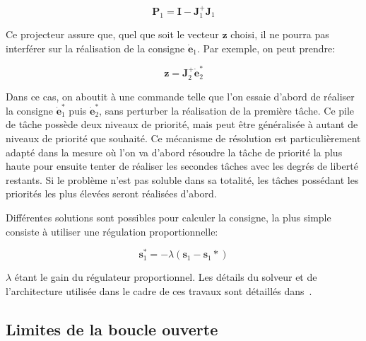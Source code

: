 \begin{equation}
  \mathbf{P}_1 = \mathbf{I} - \mathbf{J}_1^{+} \mathbf{J}_1
\end{equation}

Ce projecteur assure que, quel que soit le vecteur $\mathbf{z}$
choisi, il ne pourra pas interférer sur la réalisation de la consigne
$\dot{\mathbf{e}}_1$. Par exemple, on peut prendre:

\begin{equation}
  \mathbf{z} = \mathbf{J}_2^{+} \dot{\mathbf{e}}_2^{*}
\end{equation}

Dans ce cas, on aboutit à une commande telle que l'on essaie d'abord
de réaliser la consigne $\dot{\mathbf{e}}_1^{*}$ puis
$\dot{\mathbf{e}}_2^{*}$, sans perturber la réalisation de la première
tâche. Ce pile de tâche possède deux niveaux de priorité, mais peut
être généralisée à autant de niveaux de priorité que souhaité. Ce
mécanisme de résolution est particulièrement adapté dans la mesure où
l'on va d'abord résoudre la tâche de priorité la plus haute pour
ensuite tenter de réaliser les secondes tâches avec les degrés de
liberté restants. Si le problème n'est pas soluble dans sa totalité,
les tâches possédant les priorités les plus élevées seront réalisées
d'abord.


Différentes solutions sont possibles pour calculer la consigne, la
plus simple consiste à utiliser une régulation proportionnelle:

\begin{equation}
  \mathbf{s}_1^{*} = -\lambda (\mathbf{s}_1 - \mathbf{s}_1{*})
\end{equation}

$\lambda$ étant le gain du régulateur proportionnel. Les détails du
solveur et de l'architecture utilisée dans le cadre de ces travaux
sont détaillés dans \cite{09mansard.icar}.


\subsection{Limites de la boucle ouverte}


